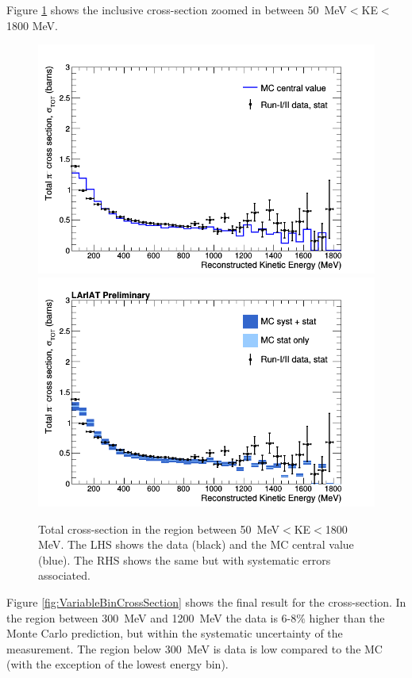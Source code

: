 Figure \ref{fig:ProperBinCrossSection} shows the inclusive cross-section zoomed in between 50~MeV$<$KE$<$1800 MeV.

\begin{figure}[h!]
\centering
\includegraphics[scale=0.30]{./images/CombinedNegPol_xsec_MC_noband_fineBinProper.png}
\includegraphics[scale=0.30]{./images/CombinedNegPol_xsec_MCband_opt1FineBinProper.png}
\caption{Total cross-section in the region between 50~MeV$<$KE$<$1800 MeV. The LHS shows the data (black) and the MC central value (blue). The RHS shows the same but with systematic errors associated. }
\label{fig:ProperBinCrossSection}
\end{figure}

Figure \ref{fig:VariableBinCrossSection} shows the final result for the cross-section. In the region between 300~MeV and 1200~MeV the data is 6-8$\%$ higher than the Monte Carlo prediction, but within the systematic uncertainty of the measurement. The region below 300~MeV is data is low compared to the MC (with the exception of the lowest energy bin).


